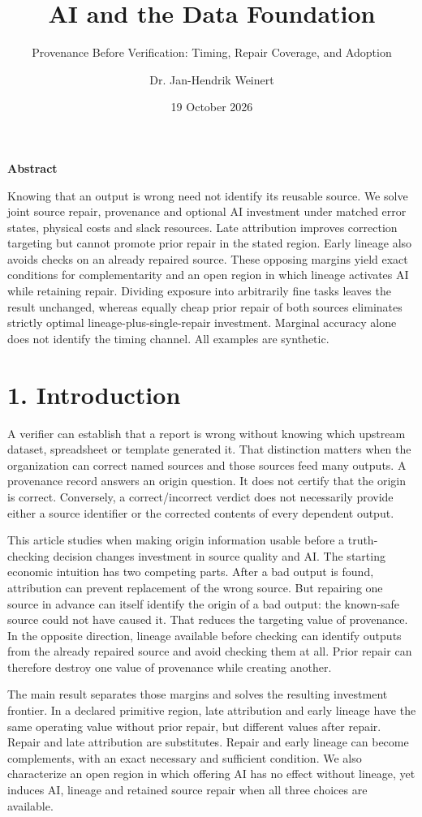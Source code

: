\documentclass[
  11pt,
  a4paper,
]{article}
\title{AI and the Data Foundation}
\subtitle{Provenance Before Verification: Timing, Repair Coverage, and
Adoption}
\author{Dr. Jan-Hendrik Weinert}
\date{19 October 2026}
\makeatletter
\renewcommand{\maketitle}{%
  \begin{center}
  {\LARGE\bfseries\@title\par}
  \vspace{0.8em}
  {\normalsize\@author\par}
  \vspace{0.35em}
  {\small\@date\par}
  \end{center}
  \vspace{0.4em}}
\renewenvironment{abstract}{%
  \begin{center}\small\bfseries Abstract\end{center}
  \begin{list}{}{\setlength{\leftmargin}{0.5in}\setlength{\rightmargin}{0.5in}}
  \item[]\small\setlength{\parindent}{0pt}\ignorespaces
}{\end{list}\vspace{0.6em}}
\makeatother
\begin{document}
\maketitle
\begin{abstract}
Knowing that an output is wrong need not identify its reusable source. We solve joint source repair, provenance and optional AI investment under matched error states, physical costs and slack resources. Late attribution improves correction targeting but cannot promote prior repair in the stated region. Early lineage also avoids checks on an already repaired source. These opposing margins yield exact conditions for complementarity and an open region in which lineage activates AI while retaining repair. Dividing exposure into arbitrarily fine tasks leaves the result unchanged, whereas equally cheap prior repair of both sources eliminates strictly optimal lineage-plus-single-repair investment. Marginal accuracy alone does not identify the timing channel. All examples are synthetic.
\end{abstract}
\section{1. Introduction}\label{why-the-timing-of-provenance-matters}

A verifier can establish that a report is wrong without knowing which
upstream dataset, spreadsheet or template generated it. That distinction
matters when the organization can correct named sources and those
sources feed many outputs. A provenance record answers an origin
question. It does not certify that the origin is correct. Conversely, a
correct/incorrect verdict does not necessarily provide either a source
identifier or the corrected contents of every dependent output.

This article studies when making origin information usable before a
truth-checking decision changes investment in source quality and AI. The
starting economic intuition has two competing parts. After a bad output
is found, attribution can prevent replacement of the wrong source. But
repairing one source in advance can itself identify the origin of a bad
output: the known-safe source could not have caused it. That reduces the
targeting value of provenance. In the opposite direction, lineage
available before checking can identify outputs from the already repaired
source and avoid checking them at all. Prior repair can therefore
destroy one value of provenance while creating another.

The main result separates those margins and solves the resulting
investment frontier. In a declared primitive region, late attribution
and early lineage have the same operating value without prior repair,
but different values after repair. Repair and late attribution are
substitutes. Repair and early lineage can become complements, with an
exact necessary and sufficient condition. We also characterize an open
region in which offering AI has no effect without lineage, yet induces
AI, lineage and retained source repair when all three choices are
available.
\end{document}

